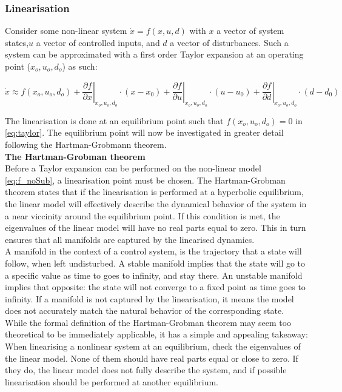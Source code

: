 \subsubsection{Linearisation} \label{sec:mod_linearisation}
Consider some non-linear system $\dot{x} = f(x,u,d)$ with $ x $ a vector of system states,$  u $ a vector of controlled inputs, and $ d $ a vector of disturbances. Such a system can be approximated with a first order Taylor expansion at an operating point ($x_o, u_o, d_o$) as such:

\begin{equation} \label{eq:taylor}
	\dot{x}   \approx   f(x_o, u_o, d_o)   +
	\left. \dfrac{\partial f}{\partial x} \right |_{x_o, u_o, d_o} \cdot (x-x_0) +
	\left. \dfrac{\partial f}{\partial u} \right |_{x_o, u_o, d_o} \cdot (u-u_0) +
	\left. \dfrac{\partial f}{\partial d} \right |_{x_o, u_o, d_o} \cdot (d-d_0)
\end{equation}

The linearisation is done at an equilibrium point such that $f(x_o, u_o, d_o) = 0$ in \cref{eq:taylor}. The equilibrium point will now be investigated in greater detail following the Hartman-Grobmann theorem.\\

\textbf{The Hartman-Grobman theorem}\\
Before a Taylor expansion can be performed on the non-linear model \cref{eq:f_noSub}, a linearisation point must be chosen. The Hartman-Grobman theorem states that if the linearisation is performed at a hyperbolic equilibrium, the linear model will effectively describe the dynamical behavior of the system in a near viccinity around the equilibrium point. If this condition is met, the eigenvalues of the linear model will have no real parts equal to zero. This in turn ensures that all manifolds are captured by the linearised dynamics. \\
A manifold in the context of a control system, is the trajectory that a state will follow, when left undisturbed. A stable manifold implies that the state will go to a specific value as time to goes to infinity, and stay there. An unstable manifold implies that opposite: the state will not converge to a fixed point as time goes to infinity. If a manifold is not captured by the linearisation, it means the model does not accurately match the natural behavior of the corresponding state.\\

While the formal definition of the Hartman-Grobman theorem may seem too theoretical to be immediately applicable, it has a simple and appealing takeaway: When linearising a nonlinear system at an equilibrium, check the eigenvalues of the linear model. None of them should have real parts equal or close to zero. If they do, the linear model does not fully describe the system, and if possible linearisation should be performed at another equilibrium.


